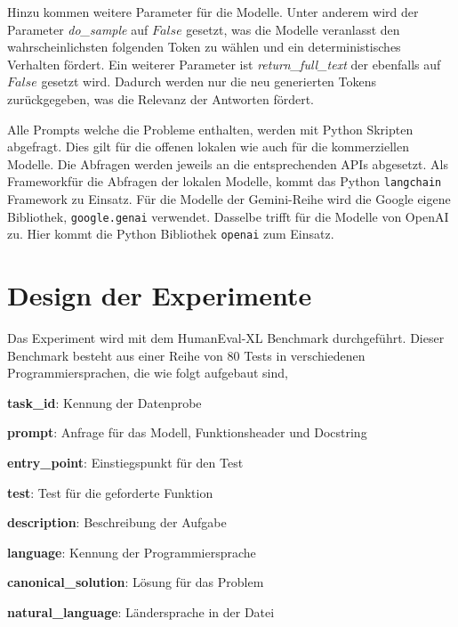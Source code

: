 Hinzu kommen weitere Parameter für die Modelle. Unter anderem wird der Parameter \textit{do\_sample} auf $False$ gesetzt, was die Modelle veranlasst den wahrscheinlichsten folgenden Token zu wählen und ein deterministisches Verhalten fördert. Ein weiterer Parameter ist \textit{return\_full\_text} der ebenfalls auf $False$ gesetzt wird. Dadurch werden nur die neu generierten Tokens zurückgegeben, was die Relevanz der Antworten fördert.\vspace{0.2cm}

Alle Prompts welche die Probleme enthalten, werden mit Python Skripten abgefragt. Dies gilt für die offenen lokalen wie auch für die kommerziellen Modelle. Die Abfragen werden jeweils an die entsprechenden APIs abgesetzt. Als Frameworkfür die Abfragen der lokalen Modelle, kommt das Python \texttt{langchain} Framework zu Einsatz. Für die Modelle der Gemini-Reihe wird die Google eigene Bibliothek, \texttt{google.genai} verwendet. Dasselbe trifft für die Modelle von OpenAI zu. Hier kommt die Python Bibliothek \texttt{openai} zum Einsatz.



\section{Design der Experimente}
Das Experiment wird mit dem HumanEval-XL Benchmark durchgeführt. Dieser Benchmark besteht aus einer Reihe von 80 Tests in verschiedenen Programmiersprachen, die wie folgt aufgebaut sind,

\begin{myitemize}
	\item \textbf{task\_id}: Kennung der Datenprobe
	\item \textbf{prompt}: Anfrage für das Modell, Funktionsheader und Docstring
	\item \textbf{entry\_point}: Einstiegspunkt für den Test
	\item \textbf{test}: Test für die geforderte Funktion
	\item \textbf{description}: Beschreibung der Aufgabe
	\item \textbf{language}: Kennung der Programmiersprache
	\item \textbf{canonical\_solution}: Lösung für das Problem
	\item \textbf{natural\_language}: Ländersprache in der Datei
\end{myitemize}


